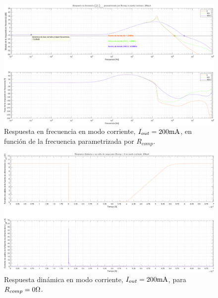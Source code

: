 \begin{figure}[H] %
\begin{center}
\includegraphics[width=1.1 \textwidth, angle=90]{./img/plots/rf/power_supply_RCOMP_RF_Modo4.png}
\caption{\label{fig:fig_power_supply_RCOMP_RF_Modo4}\footnotesize{Respuesta en frecuencia en modo corriente, $I_{out} = 200 \si[per-mode=symbol]{\milli\ampere}$, en función de la frecuencia parametrizada por $R_{comp}$.}}
\end{center}
\end{figure}

\clearpage

\begin{figure}[H] %
\begin{center}
\includegraphics[width=1.1 \textwidth, angle=90]{./img/plots/dynamic/power_supply_RCOMP_0_STEP_Modo4.png}
\caption{\label{fig:fig_power_supply_RCOMP_STEP_0_Modo4}\footnotesize{Respuesta dinámica en modo corriente, $I_{out} = 200 \si[per-mode=symbol]{\milli\ampere}$, para $R_{comp} = 0 \si[per-mode=symbol]{\ohm} $.}}
\end{center}
\end{figure}

